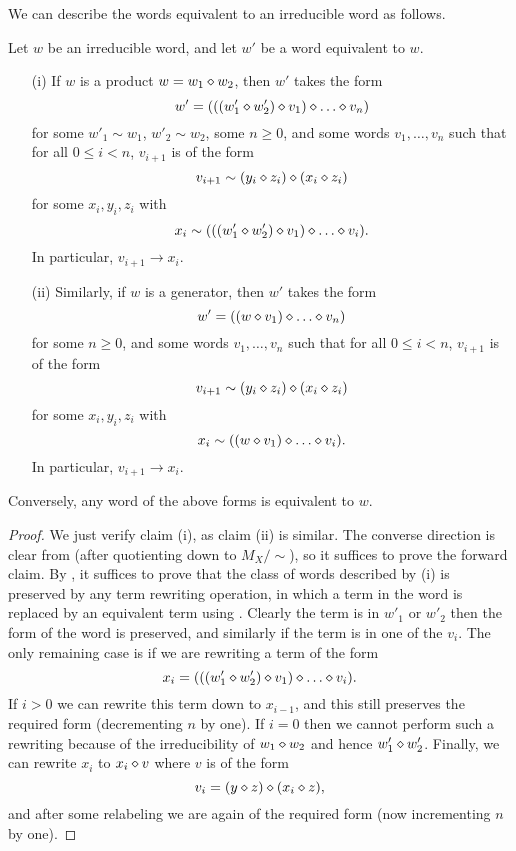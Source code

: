 We can describe the words equivalent to an irreducible word as follows.

\begin{theorem}\label{irred-desc}  Let $w$ be an irreducible word, and let $w'$ be a word equivalent to $w$.
  \begin{itemize}
    \item[(i)] If $w$ is a product $w = w_1 \diamond w_2$, then $w'$ takes the form
$$ w' = (((w'_1 \op w'_2) \op v_1) \op \dots \op v_n)$$
for some $w'_1 \sim w_1$, $w'_2 \sim w_2$, some $n \geq 0$, and some words $v_1, \dots, v_n$ such that for all $0 \leq i < n$, $v_{i+1}$ is of the form
$$ v_{i+1} \sim (y_i \diamond z_i) \diamond (x_i \diamond z_i)$$
for some $x_i, y_i, z_i$ with
$$ x_i \sim (((w'_1 \op w'_2) \op v_1) \op \dots \op v_i).$$
In particular, $v_{i+1} \to x_i$.
    \item[(ii)] Similarly, if $w$ is a generator, then $w'$ takes the form
$$ w' = ((w \op v_1) \op \dots \op v_n)$$
for some $n \geq 0$, and some words $v_1, \dots, v_n$ such that for all $0 \leq i < n$, $v_{i+1}$ is of the form
$$ v_{i+1} \sim (y_i \diamond z_i) \diamond (x_i \diamond z_i)$$
for some $x_i, y_i, z_i$ with
$$ x_i \sim ((w \op v_1) \op \dots \op v_i).$$
In particular, $v_{i+1} \to x_i$.
\end{itemize}
Conversely, any word of the above forms is equivalent to $w$.
\end{theorem}

\begin{proof}  We just verify claim (i), as claim (ii) is similar.  The converse direction is clear from  (after quotienting down to $M_X/\sim$), so it suffices to prove the forward claim. By , it suffices to prove that the class of words described by (i) is preserved by any term rewriting operation, in which a term in the word is replaced by an equivalent term using .  Clearly the term is in $w'_1$ or $w'_2$ then the form of the word is preserved, and similarly if the term is in one of the $v_i$.  The only remaining case is if we are rewriting a term of the form
$$ x_i = (((w'_1 \op w'_2) \op v_1) \op \dots \op v_i).$$
If $i>0$ we can rewrite this term down to $x_{i-1}$, and this still preserves the required form (decrementing $n$ by one).  If $i=0$ then we cannot perform such a rewriting because of the irreducibility of $w_1 \diamond w_2$ and hence $w'_1 \diamond w'_2$.  Finally, we can rewrite $x_i$ to $x_i \diamond v$ where $v$ is of the form
$$ v_i = (y \diamond z) \diamond (x_i \diamond z),$$
and after some relabeling we are again of the required form (now incrementing $n$ by one).
\end{proof}

